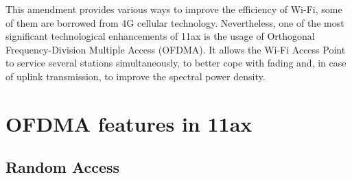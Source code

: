 This amendment provides various ways to improve the efficiency of Wi-Fi, some of them are borrowed from 4G cellular technology. Nevertheless, one of the most significant technological enhancements of 11ax is the usage of Orthogonal Frequency-Division Multiple Access (OFDMA). It allows the Wi-Fi Access Point to service several stations simultaneously, to better cope with fading and, in case of uplink transmission, to improve the spectral power density.

\section{OFDMA features in 11ax}

\subsection{Random Access}


